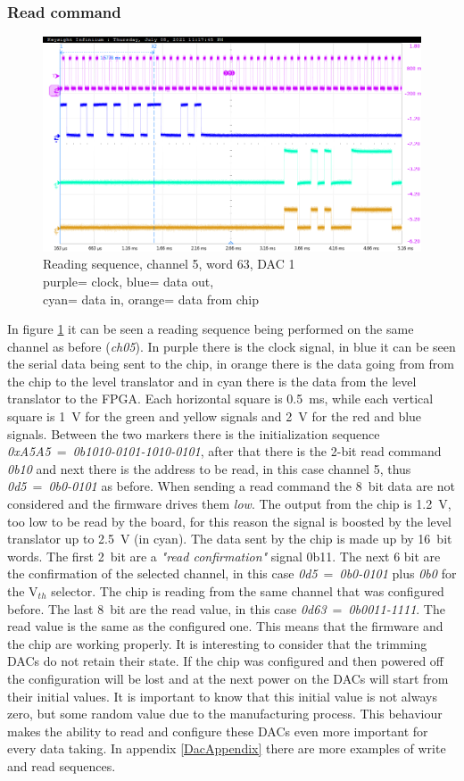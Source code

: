\subsubsection{Read command}
\begin{figure}[H]
	\centering
	\includegraphics[width=0.7\linewidth]{IMG/ch5/probe/09-08-2021_ch05-read63-baselinedac1}
	\caption{Reading sequence, channel 5, word 63, DAC 1\\{\color{magenta}purple}= clock, {\color{blue}blue}= data out,\\{\color{cyan}cyan}= data in, {\color{orange}orange}= data from chip}
	\label{fig:ch05read63}
\end{figure}
\noindent In figure \ref{fig:ch05read63} it can be seen a reading sequence being performed on the same channel as before (\textit{ch05}).
In purple there is the clock signal, in blue it can be seen the serial data being sent to the chip, in orange there is the data going from from the chip to the level translator and in cyan there is the data from the level translator to the FPGA.
Each horizontal square is 0.5~ms, while each vertical square is 1~V for the green and yellow signals and 2~V for the red and blue signals.
Between the two markers there is the initialization sequence \textit{0xA5A5}~=~\textit{0b1010-0101-1010-0101}, after that there is the 2-bit read command \textit{0b10} and next there is the address to be read, in this case channel 5, thus \textit{0d5}~=~\textit{0b0-0101} as before.
When sending a read command the 8~bit data are not considered and the firmware drives them \textit{low}.
The output from the chip is 1.2~V, too low to be read by the board, for this reason the signal is boosted by the level translator up to 2.5~V (in cyan).
The data sent by the chip is made up by 16~bit words. The first 2~bit are a \textit{"read confirmation"} signal 0b11. The next 6 bit are the confirmation of the selected channel, in this case \textit{0d5}~=~\textit{0b0-0101} plus \textit{0b0} for the V$_{th}$ selector.
The chip is reading from the same channel that was configured before.
The last 8~bit are the read value, in this case \textit{0d63}~=~\textit{0b0011-1111}.
The read value is the same as the configured one. This means that the firmware and the chip are working properly.
It is interesting to consider that the trimming DACs do not retain their state.
If the chip was configured and then powered off the configuration will be lost and at the next power on the DACs will start from their initial values.
It is important to know that this initial value is not always zero, but some random value due to the manufacturing process.
This behaviour makes the ability to read and configure these DACs even more important for every data taking. In appendix \ref{DacAppendix} there are more examples of write and read sequences. 
